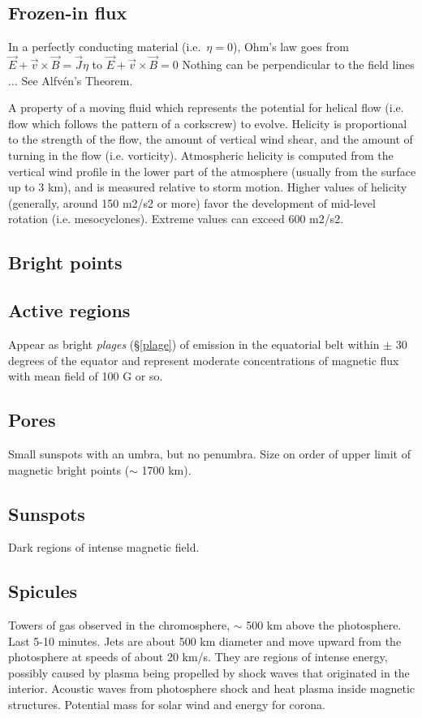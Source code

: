 \documentclass{article}
\begin{document}
\subsection{Frozen-in flux}
In a perfectly conducting material (i.e.\ $\eta = 0$),
Ohm's law goes from
$ \vec{E} + \vec{v} \times \vec{B} = \vec{J}\eta $ to
$ \vec{E} + \vec{v} \times \vec{B} = 0 $
Nothing can be perpendicular to the field lines $\ldots$
See Alfv\'en's Theorem.

A property of a moving fluid which represents the potential for helical flow
(i.e. flow which follows the pattern of a corkscrew) to evolve. Helicity is
proportional to the strength of the flow, the amount of vertical wind shear,
and the amount of turning in the flow (i.e. vorticity). Atmospheric helicity is
computed from the vertical wind profile in the lower part of the atmosphere
(usually from the surface up to 3 km), and is measured relative to storm
motion. Higher values of helicity (generally, around 150 m2/s2 or more) favor
the development of mid-level rotation (i.e. mesocyclones). Extreme values can
exceed 600 m2/s2.

\subsection{Bright points}

\subsection{Active regions}
Appear as bright \textit{plages} (\S \ref{plage})
of emission in the equatorial belt within $\pm$
30 degrees of the equator and represent moderate concentrations of magnetic flux
with mean field of 100 G or so.

\subsection{Pores}
Small sunspots with an umbra, but no penumbra. Size on order of upper limit of
magnetic bright points ($\sim$ 1700 km).

\subsection{Sunspots}
Dark regions of intense magnetic field.

\subsection{Spicules}
Towers of gas observed in the chromosphere, $\sim$ 500 km above the
photosphere. Last 5-10 minutes. Jets are about 500 km diameter and move upward
from the photosphere at speeds of about 20 km/s. They are regions of intense
energy, possibly caused by plasma being propelled by shock waves that
originated in the interior. Acoustic waves from photosphere shock and heat
plasma inside magnetic structures. Potential mass for solar wind and energy for
corona.
\end{document}
